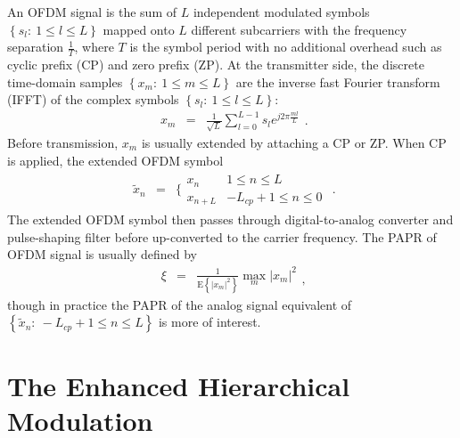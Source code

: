 \documentclass[10pt,fleqn, twocolumn]{IEEEtran}
\begin{document}
An OFDM signal is the sum of $L$ independent modulated symbols
$\left\{s_{l}:\ 1\leq l\leq L\right\}$ mapped onto $L$ different
subcarriers with the frequency separation $\frac{1}{T}$, where $T$
is the symbol period with no additional overhead such as cyclic
prefix (CP) and zero prefix (ZP). At the transmitter side, the
discrete time-domain samples $\left\{x_{m}:\ 1\leq m\leq
L\right\}$ are the inverse fast Fourier transform (IFFT) of the
complex symbols $\left\{s_{l}:\ 1\leq l\leq L\right\}$:
\begin{equation}
\begin{array}{lcl}
x_{m}&=&\frac{1}{\sqrt{L}}\sum\limits_{l=0}^{L-1}s_{l}e^{j2\pi\frac{ml}{L}}
\end{array}.\label{OFDM}
\end{equation}
\noindent Before transmission, $x_{m}$ is usually extended by
attaching a CP or ZP. When CP is applied, the extended OFDM symbol
\begin{equation}
\begin{array}{rcl}
\tilde{x}_{n}&=&\Bigg\{ \begin{array}{ll}x_{n}&1\leq n\leq L\\
x_{n+L}&-L_{cp}+1\leq n\leq 0 \end{array}
\end{array}.
\end{equation}
\noindent The extended OFDM symbol then passes through
digital-to-analog converter and pulse-shaping filter before
up-converted to the carrier frequency. The PAPR of OFDM signal is
usually defined by
\begin{equation}
\begin{array}{rcl}
\xi&=&\frac{1 }{\mbox{E}\left\{\left|x_{m}\right|^2\right\}
}\max\limits_{m} \left|x_{m}\right|^{2}
\end{array},
\end{equation}
\noindent though in practice the PAPR of the analog signal
equivalent of $\left\{\tilde{x}_{n}:\ -L_{cp}+1\leq n\leq
L\right\}$ is more of interest.

\section{The Enhanced Hierarchical Modulation}

\begin{figure}
\end{figure}
\end{document}
